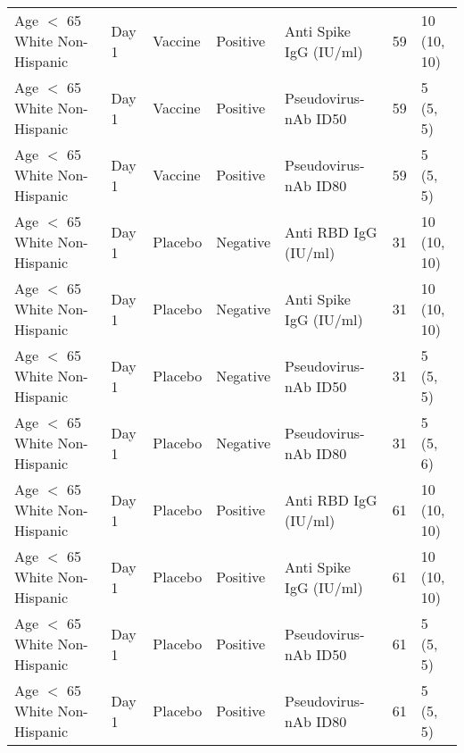 \documentclass[]{book}
\theoremstyle{definition}
\theoremstyle{definition}
\theoremstyle{definition}
\newcommand{\1}{\mathbbm{1}}
\begin{document}
\begin{landscape}
\begin{ThreePartTable}
\begin{longtable}[t]{>{\raggedright\arraybackslash}p{7cm}llllll}
\hspace{1em}Age $<$ 65 White Non-Hispanic & Day 1 & Vaccine & Positive & Anti Spike IgG (IU/ml) & 59 & \makecell[l]{10\\(10, 10)}\\
\hspace{1em}Age $<$ 65 White Non-Hispanic & Day 1 & Vaccine & Positive & Pseudovirus-nAb ID50 & 59 & \makecell[l]{5\\(5, 5)}\\
\hspace{1em}Age $<$ 65 White Non-Hispanic & Day 1 & Vaccine & Positive & Pseudovirus-nAb ID80 & 59 & \makecell[l]{5\\(5, 5)}\\
\hspace{1em}Age $<$ 65 White Non-Hispanic & Day 1 & Placebo & Negative & Anti RBD IgG (IU/ml) & 31 & \makecell[l]{10\\(10, 10)}\\
\hspace{1em}Age $<$ 65 White Non-Hispanic & Day 1 & Placebo & Negative & Anti Spike IgG (IU/ml) & 31 & \makecell[l]{10\\(10, 10)}\\
\hspace{1em}Age $<$ 65 White Non-Hispanic & Day 1 & Placebo & Negative & Pseudovirus-nAb ID50 & 31 & \makecell[l]{5\\(5, 5)}\\
\hspace{1em}Age $<$ 65 White Non-Hispanic & Day 1 & Placebo & Negative & Pseudovirus-nAb ID80 & 31 & \makecell[l]{5\\(5, 6)}\\
\hspace{1em}Age $<$ 65 White Non-Hispanic & Day 1 & Placebo & Positive & Anti RBD IgG (IU/ml) & 61 & \makecell[l]{10\\(10, 10)}\\
\hspace{1em}Age $<$ 65 White Non-Hispanic & Day 1 & Placebo & Positive & Anti Spike IgG (IU/ml) & 61 & \makecell[l]{10\\(10, 10)}\\
\hspace{1em}Age $<$ 65 White Non-Hispanic & Day 1 & Placebo & Positive & Pseudovirus-nAb ID50 & 61 & \makecell[l]{5\\(5, 5)}\\
\hspace{1em}Age $<$ 65 White Non-Hispanic & Day 1 & Placebo & Positive & Pseudovirus-nAb ID80 & 61 & \makecell[l]{5\\(5, 5)}\\

\end{longtable}
\end{ThreePartTable}
\end{landscape}
\end{document}
